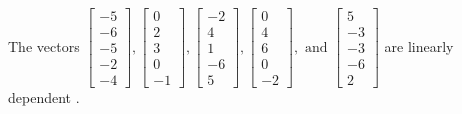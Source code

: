 \begin{exercise}
\begin{exerciseStatement}
  \end{exerciseStatement}
  \begin{exerciseAnswer}
   The vectors \(\left[\begin{array}{r}
-5 \\
-6 \\
-5 \\
-2 \\
-4
\end{array}\right] , \left[\begin{array}{r}
0 \\
2 \\
3 \\
0 \\
-1
\end{array}\right] , \left[\begin{array}{r}
-2 \\
4 \\
1 \\
-6 \\
5
\end{array}\right] , \left[\begin{array}{r}
0 \\
4 \\
6 \\
0 \\
-2
\end{array}\right] , \text{ and } \left[\begin{array}{r}
5 \\
-3 \\
-3 \\
-6 \\
2
\end{array}\right]\) are 
  	 linearly dependent  .
  


  \end{exerciseAnswer}
\end{exercise}